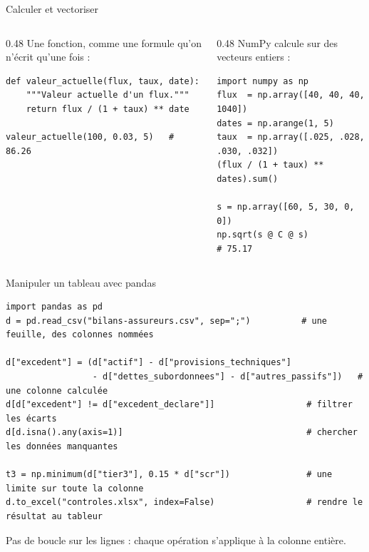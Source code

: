 \documentclass[10pt,aspectratio=169]{beamer}
\begin{document}
\begin{frame}[fragile]{Calculer et vectoriser}
\begin{columns}[T]
\begin{column}{0.48\textwidth}
\small Une fonction, comme une formule qu'on n'écrit qu'une fois :
\begin{lstlisting}
def valeur_actuelle(flux, taux, date):
    """Valeur actuelle d'un flux."""
    return flux / (1 + taux) ** date

valeur_actuelle(100, 0.03, 5)   # 86.26
\end{lstlisting}
\end{column}
\begin{column}{0.48\textwidth}
\small NumPy calcule sur des vecteurs entiers :
\begin{lstlisting}
import numpy as np
flux  = np.array([40, 40, 40, 1040])
dates = np.arange(1, 5)
taux  = np.array([.025, .028, .030, .032])
(flux / (1 + taux) ** dates).sum()

s = np.array([60, 5, 30, 0, 0])
np.sqrt(s @ C @ s)              # 75.17
\end{lstlisting}
\end{column}
\end{columns}
\end{frame}

\begin{frame}[fragile]{Manipuler un tableau avec pandas}
\begin{lstlisting}
import pandas as pd
d = pd.read_csv("bilans-assureurs.csv", sep=";")          # une feuille, des colonnes nommées

d["excedent"] = (d["actif"] - d["provisions_techniques"]
                 - d["dettes_subordonnees"] - d["autres_passifs"])   # une colonne calculée
d[d["excedent"] != d["excedent_declare"]]                  # filtrer les écarts
d[d.isna().any(axis=1)]                                    # chercher les données manquantes

t3 = np.minimum(d["tier3"], 0.15 * d["scr"])               # une limite sur toute la colonne
d.to_excel("controles.xlsx", index=False)                  # rendre le résultat au tableur
\end{lstlisting}
\small Pas de boucle sur les lignes : chaque opération s'applique à la colonne entière.
\end{frame}
\end{document}
